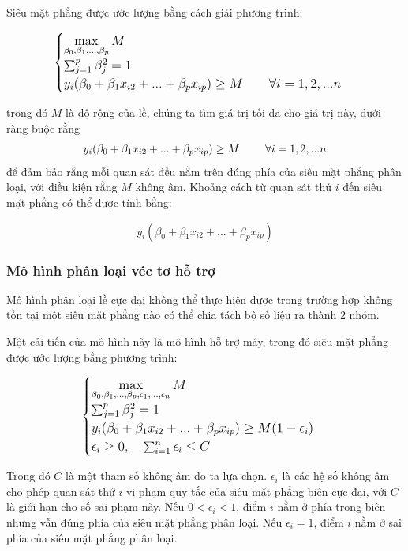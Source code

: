 Siêu mặt phẳng được ước lượng bằng cách giải phương trình:


 $$
\large
\begin{cases}
\max\limits_{\beta_0, \beta_1,...,\beta_p}M\\

\sum_{j = 1}^p \beta_j^2 = 1\\

y_i(\beta_0 + \beta_1x_{i2} + ... + \beta_px_{ip}) \geq M \qquad \forall i = 1, 2, ...n
\end{cases}
$$

trong đó $M$ là độ rộng của lề, chúng ta tìm giá trị tối đa cho giá trị này, dưới ràng buộc rằng 
 $$
\large
y_i(\beta_0 + \beta_1x_{i2} + ... + \beta_px_{ip}) \geq M \qquad \forall i = 1, 2, ...n
$$
để đảm bảo rằng mỗi quan sát đều nằm trên đúng phía của siêu mặt phẳng phân loại, với điều kiện rằng $M$ không âm.
Khoảng cách từ quan sát thứ $i$ đến siêu mặt phẳng có thể được tính bằng: 

$$
y_i(\beta_0 + \beta_1x_{i2} + ... + \beta_px_{ip})
$$


\subsubsection{Mô hình phân loại véc tơ hỗ trợ}

Mô hình phân loại lề cực đại không thể thực hiện được trong trường hợp không tồn tại một siêu mặt phẳng nào có thể chia tách bộ số liệu ra thành 2 nhóm.

Một cải tiến của mô hình này là mô hình hỗ trợ máy, trong đó siêu mặt phẳng được ước lượng bằng phương trình:

$$
\large
\begin{cases}
\max\limits_{\beta_0, \beta_1,...,\beta_p, \epsilon_1, ... , \epsilon_n}M\\

\sum_{j = 1}^p \beta_j^2 = 1\\

y_i(\beta_0 + \beta_1x_{i2} + ... + \beta_px_{ip}) \geq M(1-\epsilon_i) \\

\epsilon_i \geq 0, \quad \sum_{i = 1}^n \epsilon_i \leq C
\end{cases}
$$

Trong đó $C$ là một tham số không âm do ta lựa chọn. $\epsilon_i$ là các hệ số không âm cho phép quan sát thứ $i$ vi phạm quy tắc của siêu mặt phẳng biên cực đại, với $C$ là giới hạn cho số sai phạm này. Nếu $0 < \epsilon_i < 1$, điểm $i$ nằm ở phía trong biên nhưng vẫn đúng phía của siêu mặt phẳng phân loại. Nếu $\epsilon_i = 1$, điểm $i$ nằm ở sai phía của siêu mặt phẳng phân loại.

